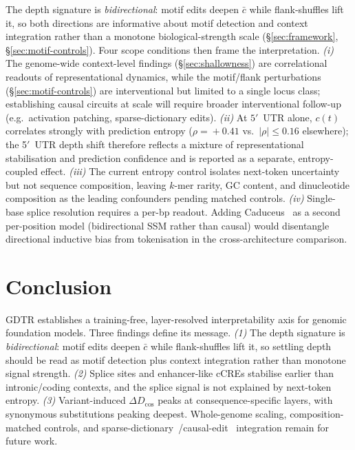 \documentclass{article}
\theoremstyle{plain}
\theoremstyle{definition}
\theoremstyle{remark}
\newcommand{\gDTR}{\textsc{GDTR}}
\newcommand{\DDcos}{\Delta D_{\cos}}
\begin{document}
The depth signature is \emph{bidirectional}: motif edits deepen $\bar c$ while flank-shuffles lift it, so both directions are informative about motif detection and context integration rather than a monotone biological-strength scale (\S\ref{sec:framework}, \S\ref{sec:motif-controls}). Four scope conditions then frame the interpretation. \emph{(i)} The genome-wide context-level findings (\S\ref{sec:shallowness}) are correlational readouts of representational dynamics, while the motif/flank perturbations (\S\ref{sec:motif-controls}) are interventional but limited to a single locus class; establishing causal circuits at scale will require broader interventional follow-up (e.g.\ activation patching, sparse-dictionary edits). \emph{(ii)} At $5'$~UTR alone, $c(t)$ correlates strongly with prediction entropy ($\rho\!=\!+0.41$ vs.\ $|\rho|\!\le\!0.16$ elsewhere); the 5$'$~UTR depth shift therefore reflects a mixture of representational stabilisation and prediction confidence and is reported as a separate, entropy-coupled effect. \emph{(iii)} The current entropy control isolates next-token uncertainty but not sequence composition, leaving $k$-mer rarity, GC content, and dinucleotide composition as the leading confounders pending matched controls. \emph{(iv)} Single-base splice resolution requires a per-bp readout. Adding Caduceus~\cite{schiff2024caduceus} as a second per-position model (bidirectional SSM rather than causal) would disentangle directional inductive bias from tokenisation in the cross-architecture comparison.

\section{Conclusion}
\label{sec:conclusion}

\gDTR{} establishes a training-free, layer-resolved interpretability axis for genomic foundation models. Three findings define its message. \emph{(1)} The depth signature is \emph{bidirectional}: motif edits deepen $\bar c$ while flank-shuffles lift it, so settling depth should be read as motif detection plus context integration rather than monotone signal strength. \emph{(2)} Splice sites and enhancer-like cCREs stabilise earlier than intronic/coding contexts, and the splice signal is not explained by next-token entropy. \emph{(3)} Variant-induced $\DDcos$ peaks at consequence-specific layers, with synonymous substitutions peaking deepest. Whole-genome scaling, composition-matched controls, and sparse-dictionary~\cite{cunningham2023sparse}/causal-edit~\cite{meng2022rome} integration remain for future work.
\end{document}
